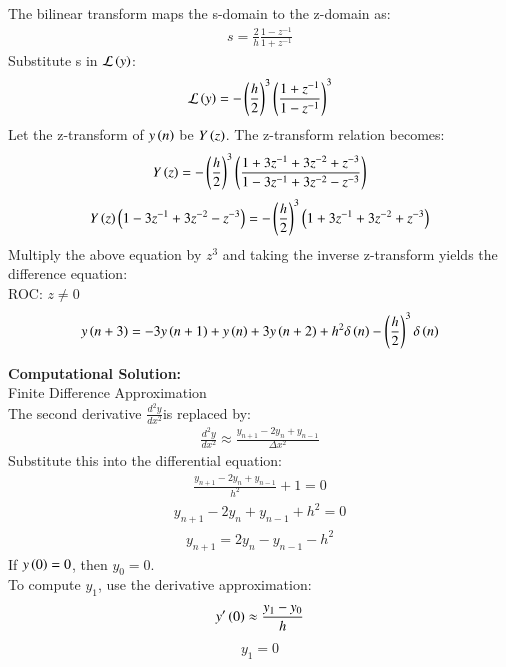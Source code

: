 \documentclass[journal]{IEEEtran}
\numberwithin{equation}{enumi}
\numberwithin{figure}{enumi}
\begin{document}
The bilinear transform maps the s-domain to the z-domain as:
\begin{align}
	s = \frac{2}{h}\frac{1 - z^{-1}}{1 + z^{-1}}
\end{align}
Substitute s in $\mathcal{L}\left(y\right)$:
\begin{align}
	\mathcal{L}\left(y\right) = -\left(\frac{h}{2}\right)^3 \left(\frac{1 + z^{-1}}{1 - z^{-1}}\right)^3
\end{align}
Let the z-transform of $y\left(n\right)$ be $Y\left(z\right)$. The z-transform relation becomes:
\begin{align}
	Y\left(z\right) = -\left(\frac{h}{2}\right)^3 \left(\frac{1 + 3z^{-1} + 3z^{-2} + z^{-3}}{1 - 3z^{-1} + 3z^{-2} - z^{-3}}\right)
\end{align}
\begin{align}
	Y\left(z\right)\left(1 - 3z^{-1} + 3z^{-2} - z^{-3}\right) = -\left(\frac{h}{2}\right)^3 \left(1 + 3z^{-1} + 3z^{-2} + z^{-3}\right)
\end{align}
Multiply the above equation by $z^3$ and taking the inverse z-transform yields the difference equation: \\
ROC: $z \neq 0$
\begin{align}
	y\left(n+3\right) = -3y\left(n+1\right) + y\left(n\right) + 3y\left(n+2\right) + h^2\delta \left(n\right) - \left(\frac{h}{2}\right)^3\delta \left(n\right)
\end{align}

\textbf{Computational Solution:} \\
Finite Difference Approximation \\
The second derivative $\frac{d^2y}{dx^2}$is replaced by:\\
\begin{align}
	\frac{d^2y}{dx^2} \approx \frac{y_{n+1} - 2y_n + y_{n-1}}{\Delta x^2}
\end{align}
Substitute this into the differential equation:
\begin{align}
	\frac{y_{n+1} - 2y_n + y_{n-1}}{h^2} + 1 = 0
\end{align}
\begin{align}
	y_{n+1} - 2y_n + y_{n-1} + h^2 = 0
\end{align}
\begin{align}
	y_{n+1} = 2y_n - y_{n-1} - h^2
\end{align}
If $y\left(0\right) = 0$, then $y_0 = 0$. \\
To compute $y_1$, use the derivative approximation:
\begin{align}
	y^{\prime}\left(0\right) \approx \frac{y_1 - y_0}{h}
\end{align}
\begin{align}
	y_1 = 0
\end{align}
\end{document}
